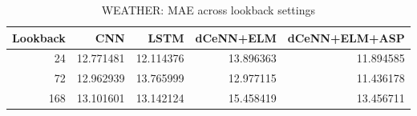 \begin{table}
\caption{WEATHER: MAE across lookback settings}
\begin{tabular}{rrrrr}
\toprule
Lookback & CNN & LSTM & dCeNN+ELM & dCeNN+ELM+ASP \\
\midrule
24 & 12.771481 & 12.114376 & 13.896363 & 11.894585 \\
72 & 12.962939 & 13.765999 & 12.977115 & 11.436178 \\
168 & 13.101601 & 13.142124 & 15.458419 & 13.456711 \\
\bottomrule
\end{tabular}
\end{table}

